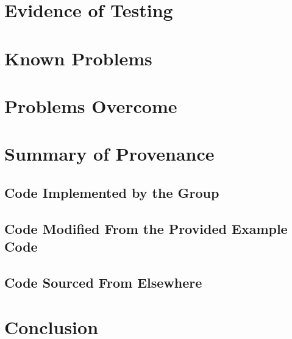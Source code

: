 \documentclass[11]{article}
\begin{document}
	\section{Evidence of Testing}	

		
	\section{Known Problems}

		
	\section{Problems Overcome}

	\section{Summary of Provenance}
			\subsection{Code Implemented by the Group} 

			\subsection{Code Modified From the Provided Example Code}

			\subsection{Code Sourced From Elsewhere}
				
	
\section{Conclusion}
\end{document}
